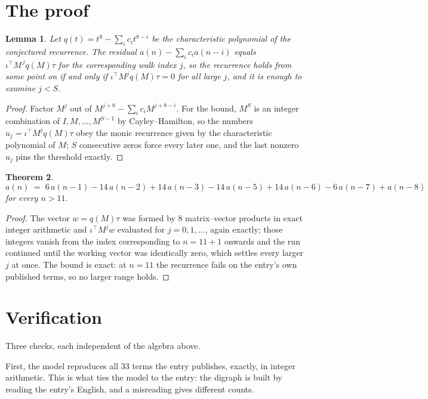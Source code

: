 \documentclass[11pt,a4paper]{article}
\theoremstyle{plain}
\newtheorem{theorem}{Theorem}
\newtheorem{lemma}[theorem]{Lemma}
\theoremstyle{definition}
\begin{document}
\section{The proof}

\begin{lemma}\label{lem:crit}
Let $q(t)=t^{8}-\sum_i c_it^{8-i}$ be the characteristic polynomial of the
conjectured recurrence. The residual $a(n)-\sum_ic_ia(n-i)$ equals
$\iota^{\!\top}M^{\,j}q(M)\tau$ for the corresponding walk index $j$, so the recurrence
holds from some point on if and only if $\iota^{\!\top}M^{j}q(M)\tau=0$ for all large $j$,
and it is enough to examine $j<S$.
\end{lemma}

\begin{proof}
Factor $M^{j}$ out of $M^{j+8}-\sum_ic_iM^{j+8-i}$. For the bound, $M^{S}$
is an integer combination of $I,M,\dots,M^{S-1}$ by Cayley--Hamilton, so the numbers
$u_j=\iota^{\!\top}M^{j}q(M)\tau$ obey the monic recurrence given by the characteristic
polynomial of $M$; $S$ consecutive zeros force every later one, and the last nonzero $u_j$
pins the threshold exactly.
\end{proof}

\begin{theorem}
\[
a(n)\;=\;6\,a(n-1) - 14\,a(n-2) + 14\,a(n-3) - 14\,a(n-5) + 14\,a(n-6) - 6\,a(n-7) + a(n-8)
\]
for every $n>11$.
\end{theorem}

\begin{proof}
The vector $w=q(M)\tau$ was formed by $8$ matrix--vector products in exact integer
arithmetic and $\iota^{\!\top}M^{j}w$ evaluated for $j=0,1,\dots$, again exactly; those
integers vanish from the index corresponding to $n=11+1$ onwards and the run continued
until the working vector was identically zero, which settles every larger $j$ at once. The bound is exact: at $n=11$ the recurrence fails on the entry's own published terms, so no larger range holds.
\end{proof}

\section{Verification}

Three checks, each independent of the algebra above.

First, the model reproduces all $33$ terms the entry publishes, exactly, in integer
arithmetic. This is what ties the model to the entry: the digraph is built by reading the
entry's English, and a misreading gives different counts.
\end{document}
